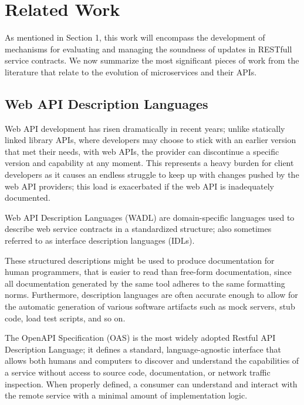 
%

\chapter{Related Work}
\label{cha:related_work}

As mentioned in Section 1, this work will encompass the development of
mechanisms for evaluating and managing the soundness of updates in RESTfull service contracts.
We now summarize the most significant pieces of work from the literature
that relate to the evolution of microservices and their APIs.

\section{Web API Description Languages} %
\label{sec:web_api_description_languages}

Web API development has risen dramatically in recent years;  unlike statically linked library APIs,
where developers may choose to stick with an earlier version that met their needs, with web APIs,
the provider can discontinue a specific version and capability at any moment.
This represents a heavy burden for client developers as it causes an endless struggle to keep up
with changes pushed by the web API providers; this load is exacerbated if the web API is inadequately documented.

Web API Description Languages (WADL) are domain-specific languages used to describe web service contracts in a standardized structure;
also sometimes referred to as interface description languages (IDLs).

These structured descriptions might be used to produce documentation for human programmers, that is easier to read than free-form documentation,
since all documentation generated by the same tool adheres to the same formatting norms.
Furthermore, description languages are often accurate enough to allow for the automatic generation of various software artifacts such as mock servers,
stub code, load test scripts, and so on.

The OpenAPI Specification (OAS) is the most widely adopted Restful API Description Language;
it defines a standard, language-agnostic interface that allows both humans and computers to discover and
understand the capabilities of a service without access to source code, documentation, or network traffic inspection.
When properly defined, a consumer can understand and interact with the remote service with a minimal amount of implementation logic.


